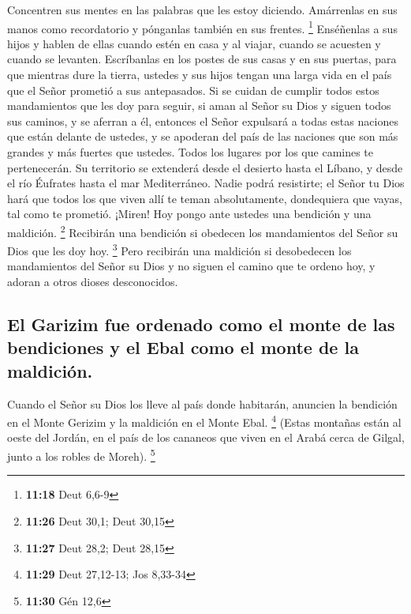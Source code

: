  Concentren sus mentes en las palabras que les estoy
diciendo. Amárrenlas en sus manos como recordatorio y pónganlas también
en sus frentes. \footnote{\textbf{11:18} Deut 6,6-9} 
Enséñenlas a sus hijos y hablen de ellas cuando estén en casa y al
viajar, cuando se acuesten y cuando se levanten. 
Escríbanlas en los postes de sus casas y en sus puertas, 
para que mientras dure la tierra, ustedes y sus hijos tengan una larga
vida en el país que el Señor prometió a sus antepasados. 
Si se cuidan de cumplir todos estos mandamientos que les doy para
seguir, si aman al Señor su Dios y siguen todos sus caminos, y se
aferran a él,  entonces el Señor expulsará a todas estas
naciones que están delante de ustedes, y se apoderan del país de las
naciones que son más grandes y más fuertes que ustedes. 
Todos los lugares por los que camines te pertenecerán. Su territorio se
extenderá desde el desierto hasta el Líbano, y desde el río Éufrates
hasta el mar Mediterráneo.  Nadie podrá resistirte; el
Señor tu Dios hará que todos los que viven allí te teman absolutamente,
dondequiera que vayas, tal como te prometió.  ¡Miren! Hoy
pongo ante ustedes una bendición y una maldición. \footnote{\textbf{11:26}
  Deut 30,1; Deut 30,15}  Recibirán una bendición si
obedecen los mandamientos del Señor su Dios que les doy hoy. \footnote{\textbf{11:27}
  Deut 28,2; Deut 28,15}  Pero recibirán una maldición si
desobedecen los mandamientos del Señor su Dios y no siguen el camino que
te ordeno hoy, y adoran a otros dioses desconocidos.

\hypertarget{el-garizim-fue-ordenado-como-el-monte-de-las-bendiciones-y-el-ebal-como-el-monte-de-la-maldiciuxf3n.}{%
\subsection{El Garizim fue ordenado como el monte de las bendiciones y
el Ebal como el monte de la
maldición.}\label{el-garizim-fue-ordenado-como-el-monte-de-las-bendiciones-y-el-ebal-como-el-monte-de-la-maldiciuxf3n.}}

 Cuando el Señor su Dios los lleve al país donde
habitarán, anuncien la bendición en el Monte Gerizim y la maldición en
el Monte Ebal. \footnote{\textbf{11:29} Deut 27,12-13; Jos 8,33-34}
 (Estas montañas están al oeste del Jordán, en el país de
los cananeos que viven en el Arabá cerca de Gilgal, junto a los robles
de Moreh). \footnote{\textbf{11:30} Gén 12,6}

